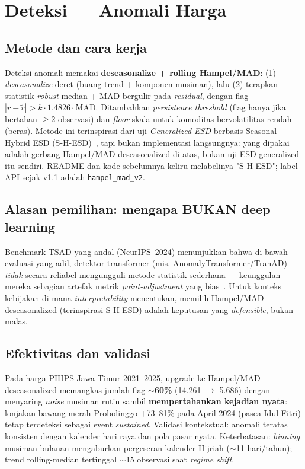 \documentclass[11pt,a4paper]{article}
\newcommand{\code}[1]{\texttt{#1}}
\begin{document}
\section{Deteksi --- Anomali Harga}

\subsection{Metode dan cara kerja}
Deteksi anomali memakai \textbf{deseasonalize + rolling Hampel/MAD}: (1) \emph{deseasonalize}
deret (buang trend + komponen musiman), lalu (2) terapkan statistik \emph{robust} median + MAD
bergulir pada \emph{residual}, dengan flag $|r - \tilde{r}| > k \cdot 1.4826 \cdot \mathrm{MAD}$.
Ditambahkan \emph{persistence threshold} (flag hanya jika bertahan $\geq 2$ observasi) dan
\emph{floor} skala untuk komoditas bervolatilitas-rendah (beras). Metode ini terinspirasi dari
uji \emph{Generalized ESD} berbasis Seasonal-Hybrid ESD (S-H-ESD)~\cite{shesd2017}, tapi bukan
implementasi langsungnya: yang dipakai adalah gerbang Hampel/MAD deseasonalized di atas, bukan
uji ESD generalized itu sendiri. README dan kode sebelumnya keliru melabelinya "S-H-ESD"; label
API sejak v1.1 adalah \code{hampel\_mad\_v2}.

\subsection{Alasan pemilihan: mengapa BUKAN deep learning}
Benchmark TSAD yang andal (NeurIPS~2024) menunjukkan bahwa di bawah evaluasi yang adil, detektor
transformer (mis. AnomalyTransformer/TranAD) \emph{tidak} secara reliabel mengungguli metode
statistik sederhana --- keunggulan mereka sebagian artefak metrik \emph{point-adjustment} yang
bias~\cite{liu2024}. Untuk konteks kebijakan di mana \emph{interpretability} menentukan, memilih
Hampel/MAD deseasonalized (terinspirasi S-H-ESD) adalah keputusan yang \emph{defensible}, bukan malas.

\subsection{Efektivitas dan validasi}
Pada harga PIHPS Jawa Timur 2021--2025, upgrade ke Hampel/MAD deseasonalized memangkas jumlah flag
$\sim$\textbf{60\%} (14.261 $\rightarrow$ 5.686) dengan menyaring \emph{noise} musiman rutin
sambil \textbf{mempertahankan kejadian nyata}: lonjakan bawang merah Probolinggo $+$73--81\%
pada April 2024 (pasca-Idul Fitri) tetap terdeteksi sebagai event \emph{sustained}. Validasi
kontekstual: anomali teratas konsisten dengan kalender hari raya dan pola pasar nyata.
Keterbatasan: \emph{binning} musiman bulanan mengaburkan pergeseran kalender Hijriah ($\sim$11
hari/tahun); trend rolling-median tertinggal $\sim$15 observasi saat \emph{regime shift}.
\end{document}
